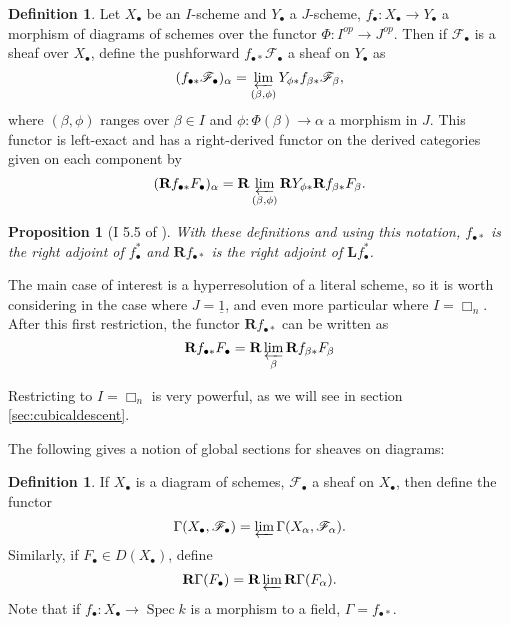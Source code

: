 \documentclass[proquest]{uwthesis}[2014/11/13]
\newtheorem{prop}[theorem]{Proposition}
\theoremstyle{definition}
\newtheorem{definition}[theorem]{Definition}
\DeclareMathOperator{\Spec}{Spec}
\newcommand{\FF}{\mathscr{F}}
\newcommand{\bL}{\textbf{L}}
\newcommand{\bR}{\textbf{R}}
\begin{document}
\begin{definition}
	\label{def:pushforward}
	Let $X_\bullet$ be an $I$-scheme and $Y_\bullet$ a $J$-scheme, $f_\bullet : X_\bullet \rightarrow Y_\bullet$ a morphism of diagrams of schemes over the functor $\Phi : I^{op} \rightarrow J^{op}$.
	Then if $\FF_\bullet$ is a sheaf over $X_\bullet$, define the pushforward $f_{\bullet*} \FF_\bullet$ a sheaf on $Y_\bullet$ as
	\[
	(f_{\bullet*} \FF_\bullet)_\alpha = \varprojlim_{(\beta, \phi)} Y_{\phi *} f_{\beta *} \FF_\beta,
	\]
	where $(\beta, \phi)$ ranges over $\beta \in I$ and $\phi : \Phi(\beta) \rightarrow \alpha$ a morphism in $J$.
	This functor is left-exact and has a right-derived functor on the derived categories given on each component by
	\[
	(\bR f_{\bullet*} F_\bullet)_\alpha = \bR \varprojlim_{(\beta, \phi)} \bR Y_{\phi *} \bR f_{\beta *} F_\beta.
	\]
\end{definition}

\begin{prop}[I 5.5 of \cite{Guillen1988}]
	With these definitions and using this notation, $f_{\bullet *}$ is the right adjoint of $f_\bullet^*$ and $\bR f_{\bullet *}$ is the right adjoint of $\bL f_\bullet^*$.
\end{prop}



The main case of interest is a hyperresolution of a literal scheme, so it is worth considering in the case where $J = \underline{1}$, and even more particular where $I = \Box_n$.
After this first restriction, the functor $\bR f_{\bullet *}$ can be written as
\[
\bR f_{\bullet*} F_\bullet = \bR \varprojlim_\beta \bR f_{\beta *} F_\beta
\]

Restricting to $I = \Box_n$ is very powerful, as we will see in section \ref{sec:cubicaldescent}.

The following gives a notion of global sections for sheaves on diagrams:

\begin{definition}
	If $X_\bullet$ is a diagram of schemes, $\FF_\bullet$ a sheaf on $X_\bullet$, then define the functor
	\[
	\Gamma(X_\bullet, \FF_\bullet) = \varprojlim \Gamma(X_\alpha, \FF_\alpha).
	\]
	Similarly, if $F_\bullet \in D(X_\bullet)$, define
	\[
	\bR \Gamma(F_\bullet) = \bR \varprojlim \bR \Gamma(F_\alpha).
	\]
	Note that if $f_\bullet : X_\bullet \rightarrow \Spec k$ is a morphism to a field, $\Gamma = f_{\bullet *}$.
\end{definition}
\end{document}
